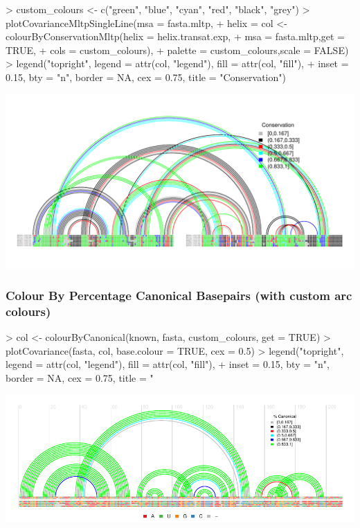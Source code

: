 \documentclass[letterpaper]{article}
\begin{document}
\begin{Schunk}
\begin{Sinput}
> custom_colours <- c("green", "blue", "cyan", "red", "black", "grey")
> plotCovarianceMltpSingleLine(msa = fasta.mltp,
+                              helix = col <- colourByConservationMltp(helix = helix.transat.exp,
+                                                                      msa = fasta.mltp,get = TRUE,
+                                                                      cols = custom_colours),
+                              palette = custom_colours,scale = FALSE)
> legend("topright", legend = attr(col, "legend"), fill = attr(col, "fill"),
+ 	inset = 0.15, bty = "n", border = NA, cex = 0.75, title = "Conservation")
\end{Sinput}
\end{Schunk}
\includegraphics{R4RNA-028}


\subsubsection{Colour By Percentage Canonical Basepairs (with custom arc colours)}

\begin{Schunk}
\begin{Sinput}
> col <- colourByCanonical(known, fasta, custom_colours, get = TRUE)
> plotCovariance(fasta, col, base.colour = TRUE, cex = 0.5)
> legend("topright", legend = attr(col, "legend"), fill = attr(col, "fill"),
+     inset = 0.15, bty = "n", border = NA, cex = 0.75, title = "%
\end{Sinput}
\end{Schunk}
\includegraphics{R4RNA-029}
\end{document}
